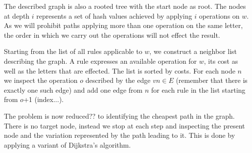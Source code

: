 \documentclass[10pt,a5paper,twoside]{article}
\begin{document}
The described graph is also a rooted tree with the start node as root.
The nodes at depth $i$ represents a set of hash values achieved by applying $i$
operations on $w$.
As we will prohibit paths %
applying more than one operation on the same letter, the order in which we
carry out the operations will not effect the result.

Starting from the list of all rules applicable to $w$, we construct a neighbor
list describing the graph. A rule expresses an available operation for $w$, its
cost as well as the letters that are effected. 
The list is sorted by costs. %
For each node $n$ we inspect the operation $o$ described by the edge $vn \in E$
(remember that there is exactly one such edge) and add one edge from $n$ for
each rule in the list starting from $o$+1 (index...).

The problem is now reduced?? to identifying the cheapest path in the graph. 
There is no target node, instead we stop at each step and
inspecting the present node and the variation represented by the path leading
to it. This is done by applying a variant of Dijkstra's algorithm. 
\end{document}
